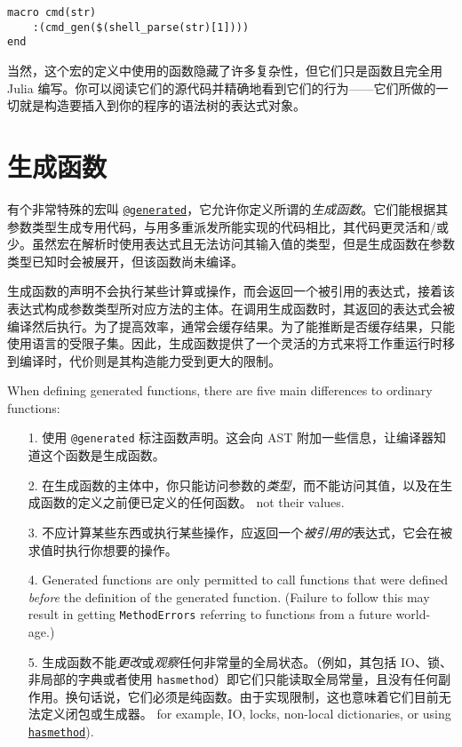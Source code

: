 \begin{verbatim}
macro cmd(str)
    :(cmd_gen($(shell_parse(str)[1])))
end
\end{verbatim}



当然，这个宏的定义中使用的函数隐藏了许多复杂性，但它们只是函数且完全用 Julia 编写。你可以阅读它们的源代码并精确地看到它们的行为——它们所做的一切就是构造要插入到你的程序的语法树的表达式对象。



\hypertarget{925665269920917597}{}


\section{生成函数}



有个非常特殊的宏叫 \hyperlink{11479538870805927749}{\texttt{@generated}}，它允许你定义所谓的\emph{生成函数}。它们能根据其参数类型生成专用代码，与用多重派发所能实现的代码相比，其代码更灵活和/或少。虽然宏在解析时使用表达式且无法访问其输入值的类型，但是生成函数在参数类型已知时会被展开，但该函数尚未编译。



生成函数的声明不会执行某些计算或操作，而会返回一个被引用的表达式，接着该表达式构成参数类型所对应方法的主体。在调用生成函数时，其返回的表达式会被编译然后执行。为了提高效率，通常会缓存结果。为了能推断是否缓存结果，只能使用语言的受限子集。因此，生成函数提供了一个灵活的方式来将工作重运行时移到编译时，代价则是其构造能力受到更大的限制。



When defining generated functions, there are five main differences to ordinary functions:



\begin{itemize}
\item[1. ] 使用 \texttt{@generated} 标注函数声明。这会向 AST 附加一些信息，让编译器知道这个函数是生成函数。


\item[2. ] 在生成函数的主体中，你只能访问参数的\emph{类型}，而不能访问其值，以及在生成函数的定义之前便已定义的任何函数。 not their values.


\item[3. ] 不应计算某些东西或执行某些操作，应返回一个\emph{被引用的}表达式，它会在被求值时执行你想要的操作。


\item[4. ] Generated functions are only permitted to call functions that were defined \emph{before} the definition of the generated function. (Failure to follow this may result in getting \texttt{MethodErrors} referring to functions from a future world-age.)


\item[5. ] 生成函数不能\emph{更改}或\emph{观察}任何非常量的全局状态。（例如，其包括 IO、锁、非局部的字典或者使用 \texttt{hasmethod}）即它们只能读取全局常量，且没有任何副作用。换句话说，它们必须是纯函数。由于实现限制，这也意味着它们目前无法定义闭包或生成器。 for example, IO, locks, non-local dictionaries, or using \hyperlink{6562783328134837372}{\texttt{hasmethod}}).

\end{itemize}


